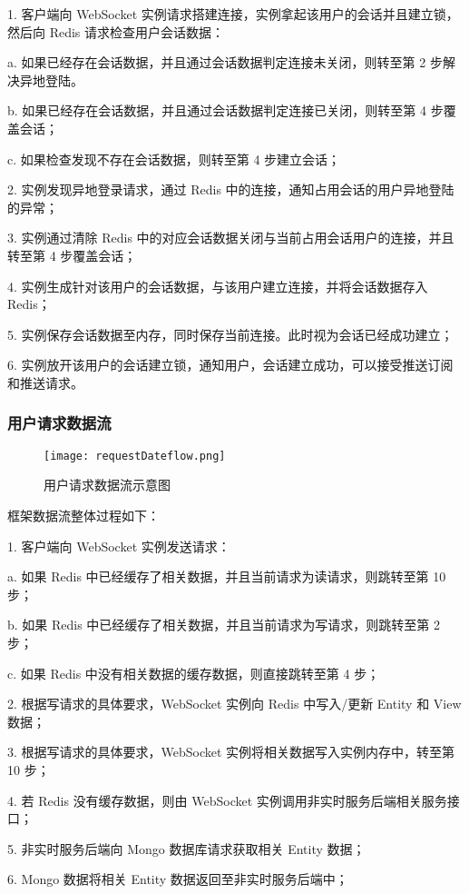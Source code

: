 1. 客户端向 WebSocket 实例请求搭建连接，实例拿起该用户的会话并且建立锁，然后向 Redis 请求检查用户会话数据：

\quad{}\quad{}a. 如果已经存在会话数据，并且通过会话数据判定连接未关闭，则转至第 2 步解决异地登陆。

\quad{}\quad{}b. 如果已经存在会话数据，并且通过会话数据判定连接已关闭，则转至第 4 步覆盖会话；

\quad{}\quad{}c. 如果检查发现不存在会话数据，则转至第 4 步建立会话；

2. 实例发现异地登录请求，通过 Redis 中的连接，通知占用会话的用户异地登陆的异常；

3. 实例通过清除 Redis 中的对应会话数据关闭与当前占用会话用户的连接，并且转至第 4 步覆盖会话；

4. 实例生成针对该用户的会话数据，与该用户建立连接，并将会话数据存入 Redis；

5. 实例保存会话数据至内存，同时保存当前连接。此时视为会话已经成功建立；

6. 实例放开该用户的会话建立锁，通知用户，会话建立成功，可以接受推送订阅和推送请求。
\subsubsection{用户请求数据流}
\begin{figure}[!htp]
  \centering
  \texttt{[image: requestDateflow.png]}
  \caption[请求数据流]
    {用户请求数据流示意图}
 \label{fig:requestDateflow}
\end{figure}
框架数据流整体过程如下：

1. 客户端向 WebSocket 实例发送请求：

\quad{}\quad{}a. 如果 Redis 中已经缓存了相关数据，并且当前请求为读请求，则跳转至第 10 步；

\quad{}\quad{}b. 如果 Redis 中已经缓存了相关数据，并且当前请求为写请求，则跳转至第 2 步；

\quad{}\quad{}c. 如果 Redis 中没有相关数据的缓存数据，则直接跳转至第 4 步；

2. 根据写请求的具体要求，WebSocket 实例向 Redis 中写入/更新 Entity 和 View数据；

3. 根据写请求的具体要求，WebSocket 实例将相关数据写入实例内存中，转至第 10 步；

4. 若 Redis 没有缓存数据，则由 WebSocket 实例调用非实时服务后端相关服务接口；

5. 非实时服务后端向 Mongo 数据库请求获取相关 Entity 数据；

6. Mongo 数据将相关 Entity 数据返回至非实时服务后端中；

